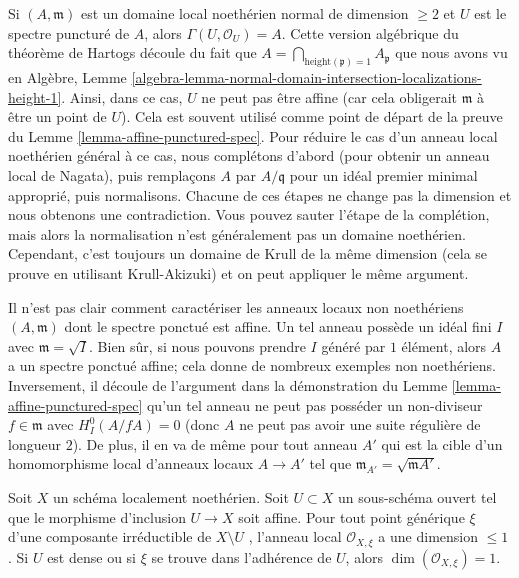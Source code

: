 \begin{remark}
\label{remark-affine-punctured-spectrum-standard-proof}
Si  $(A, \mathfrak m)$  est un domaine local noethérien normal de dimension  $\geq 2$ 
et  $U$  est le spectre puncturé de  $A$, alors  $\Gamma(U, \mathcal{O}_U) = A$. Cette
version algébrique du théorème de Hartogs découle du fait que  $A = \bigcap_{\text{height}(\mathfrak p) = 1} A_\mathfrak p$  que
nous avons vu en Algèbre, Lemme  \ref{algebra-lemma-normal-domain-intersection-localizations-height-1}. Ainsi, dans ce cas,  $U$  ne
peut pas être affine (car cela obligerait  $\mathfrak m$  à être un point de
 $U$). Cela est souvent utilisé comme point de départ de la preuve du
Lemme  \ref{lemma-affine-punctured-spec}. Pour réduire le cas d'un anneau local noethérien général à ce
cas, nous complétons d'abord (pour obtenir un anneau local de Nagata), puis
remplaçons  $A$  par  $A/\mathfrak q$  pour un idéal premier minimal approprié,
puis normalisons. Chacune de ces étapes ne change pas la dimension et nous
obtenons une contradiction. Vous pouvez sauter l'étape de la complétion, mais
alors la normalisation n'est généralement pas un domaine noethérien. Cependant,
c'est toujours un domaine de Krull de la même dimension (cela se prouve en
utilisant Krull-Akizuki) et on peut appliquer le même argument.
\end{remark}

\begin{remark}
\label{remark-affine-puctured-spectrum-general}
Il n'est pas clair comment caractériser les anneaux locaux non noethériens
 $(A, \mathfrak m)$  dont le spectre ponctué est affine. Un tel anneau possède un idéal
fini  $I$  avec  $\mathfrak m = \sqrt{I}$. Bien sûr, si nous pouvons prendre
 $I$  généré par  $1$  élément, alors  $A$  a un spectre
ponctué affine; cela donne de nombreux exemples non noethériens. Inversement, il
découle de l'argument dans la démonstration du Lemme  \ref{lemma-affine-punctured-spec}  qu'un tel anneau
ne peut pas posséder un non-diviseur  $f \in \mathfrak m$  avec  $H^0_I(A/fA) = 0$  (donc
 $A$  ne peut pas avoir une suite régulière de longueur  $2$). De
plus, il en va de même pour tout anneau  $A'$  qui est la cible d'un
homomorphisme local d'anneaux locaux  $A \to A'$  tel que  $\mathfrak m_{A'} = \sqrt{\mathfrak mA'}$.
\end{remark}

\begin{lemma}
\label{lemma-complement-affine-open-immersion}
\begin{reference}
\cite[EGA IV, Corollaire 21.12.7]{EGA4}
\end{reference}
Soit  $X$  un schéma localement noethérien. Soit  $U \subset X$  un
sous-schéma ouvert tel que le morphisme d'inclusion  $U \to X$  soit affine. Pour
tout point générique  $\xi$  d'une composante irréductible de  $X \setminus U$ ,
l'anneau local  $\mathcal{O}_{X, \xi}$  a une dimension  $\leq 1$. Si  $U$  est
dense ou si  $\xi$  se trouve dans l'adhérence de  $U$, alors
 $\dim(\mathcal{O}_{X, \xi}) = 1$.
\end{lemma}

